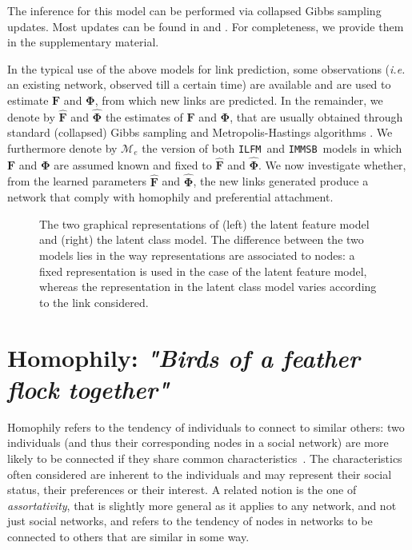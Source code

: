 \documentclass[journal]{IEEEtran}
\newcommand*{\lpath}{./}
\newcommand{\ifm}{\texttt{ILFM}}
\newcommand{\imb}{\texttt{IMMSB}}
\newcommand{\mat}[1]{\mathbf{#1}}
\begin{document}
The inference for this model can be performed via collapsed Gibbs sampling updates. Most updates can be found in \cite{HDP} and \cite{diMMSB}. For completeness, we provide them in the supplementary material.

In the typical use of the above models for link prediction, some observations (\textit{i.e.} an existing network, observed till a certain time) are available and are used to estimate $\mat{F}$ and $\mat{\Phi}$, from which new links are predicted. In the remainder, we denote by $\mat{\hat{F}}$ and $\mat{\hat{\Phi}}$ the estimates of $\mat{F}$ and $\mat{\Phi}$, that are usually obtained through standard (collapsed) Gibbs sampling and Metropolis-Hastings algorithms \cite{ILFRM,IBP,HDP,diMMSB}. We furthermore denote by $\mathcal{M}_e$ the version of both \ifm\ and \imb\ models in which $\mat{F}$ and $\mat{\Phi}$ are assumed known and fixed to $\mat{\hat{F}}$ and $\mat{\hat{\Phi}}$. We now investigate whether, from the learned parameters $\mat{\hat{F}}$ and $\mat{\hat{\Phi}}$, the new links generated produce a network that comply with homophily and preferential attachment.

\begin{figure}[t]
	\centering
	\vspace{1cm}
	\scalebox{0.88}{
	}
	\endminipage
	\scalebox{0.88}{
		}
	\endminipage
	\caption{The two graphical representations of (left) the latent feature model and (right) the latent class model. The difference between the two models lies in the way representations are associated to nodes: a fixed representation is used in the case of the latent feature model, whereas the representation in the latent class model varies according to the link considered.}
	\label{fig:mmm}
\end{figure}

\section{Homophily: \emph{"Birds of a feather flock together"}}
\label{sec:homophily}

Homophily refers to the tendency of individuals to connect to similar others: two individuals (and thus their corresponding nodes in a social network) are more likely to be connected if they share common characteristics~\cite{mcpherson2001birds,lazarsfeld1954friendship}. The characteristics often considered are inherent to the individuals and may represent their social status, their preferences or their interest. A related notion is the one of {\it assortativity}, that is slightly more general as it applies to any network, and not just social networks, and refers to the tendency of nodes in networks to be connected to others that are similar in some way.
\end{document}

